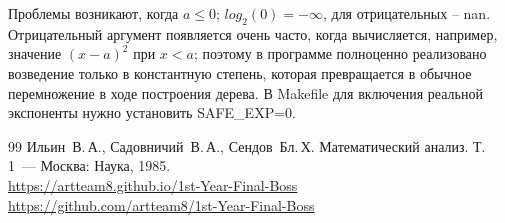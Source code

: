 \documentclass[a4paper,12pt,titlepage,finall]{article}
\begin{document}
Проблемы возникают, когда $a \leq 0$; $log_2(0) = -\infty$, для отрицательных -- nan. Отрицательный аргумент появляется очень часто, когда вычисляется, например, значение $(x-a)^2$ при $x < a$; поэтому в программе полноценно реализовано возведение только в константную степень, которая превращается в обычное перемножение в ходе построения дерева. В Makefile для включения реальной экспоненты нужно установить SAFE\_EXP=0.

\newpage
\begin{raggedright}
\begin{thebibliography}{99}
 Ильин~В.\,А., Садовничий~В.\,А., Сендов~Бл.\,Х. Математический анализ. Т.\,1~---
    Москва: Наука, 1985.\\
        \url{https://artteam8.github.io/1st-Year-Final-Boss}\\
        \url{https://github.com/artteam8/1st-Year-Final-Boss}\\
\end{thebibliography}
\end{raggedright}
\end{document}
